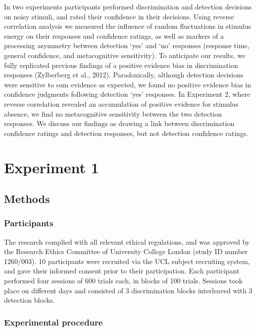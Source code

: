 \documentclass[12pt,twoside]{reedthesis}
\begin{document}
In two experiments participants performed discrimination and detection decisions on noisy stimuli, and rated their confidence in their decisions. Using reverse correlation analysis we measured the influence of random fluctuations in stimulus energy on their responses and confidence ratings, as well as markers of a processing asymmetry between detection `yes' and `no' responses (response time, general confidence, and metacognitive sensitivity). To anticipate our results, we fully replicated previous findings of a positive evidence bias in discrimination responses (Zylberberg et al., 2012). Paradoxically, although detection decisions were sensitive to sum evidence as expected, we found no positive evidence bias in confidence judgments following detection `yes' responses. In Experiment 2, where reverse correlation revealed an accumulation of positive evidence for stimulus absence, we find no metacognitive sensitivity between the two detection responses. We discuss our findings as drawing a link between discrimination confidence ratings and detection responses, but not detection confidence ratings.

\hypertarget{experiment-1-1}{%
\section{Experiment 1}\label{experiment-1-1}}

\hypertarget{methods}{%
\subsection{Methods}\label{methods}}

\hypertarget{participants-5}{%
\subsubsection{Participants}\label{participants-5}}

The research complied with all relevant ethical regulations, and was approved by the Research Ethics Committee of University College London (study ID number 1260/003). 10 participants were recruited via the UCL subject recruiting system, and gave their informed consent prior to their participation. Each participant performed four sessions of 600 trials each, in blocks of 100 trials. Sessions took place on different days and consisted of 3 discrimination blocks interleaved with 3 detection blocks.

\hypertarget{experimental-procedure}{%
\subsubsection{Experimental procedure}\label{experimental-procedure}}
\end{document}
